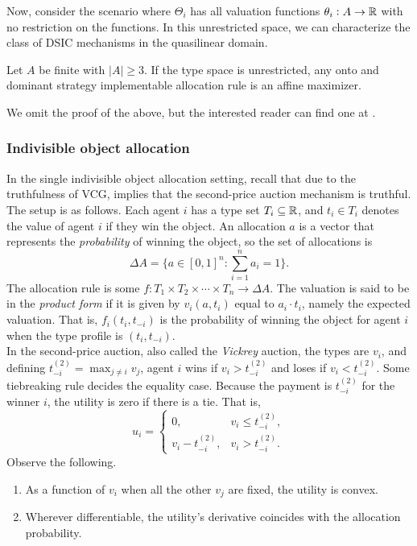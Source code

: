 		Now, consider the scenario where $\Theta_i$ has all valuation functions $\theta_i : A \to \mathbb{R}$ with no restriction on the functions. In this unrestricted space, we can characterize the class of DSIC mechanisms in the quasilinear domain.

		\begin{ftheo}[Roberts]
			Let $A$ be finite with $|A| \ge 3$. If the type space is unrestricted, any onto and dominant strategy implementable allocation rule is an affine maximizer.
		\end{ftheo}

		We omit the proof of the above, but the interested reader can find one at \cite{roberts}.

	\subsubsection{Indivisible object allocation}

		In the single indivisible object allocation setting, recall that due to the truthfulness of VCG,  implies that the second-price auction mechanism is truthful.\\

		The setup is as follows. Each agent $i$ has a type set $T_i \subseteq \mathbb{R}$, and $t_i \in T_i$ denotes the value of agent $i$ if they win the object. An allocation $a$ is a vector that represents the \emph{probability} of winning the object, so the set of allocations is
		\[ \Delta A = \{ a \in [0,1]^n : \sum_{i=1}^n a_i = 1 \}. \]
		The allocation rule is some $f : T_1 \times T_2 \times \cdots \times T_n \to \Delta A$. The valuation is said to be in the \emph{product form} if it is given by $v_i(a,t_i)$ equal to $a_i\cdot t_i$, namely the expected valuation. That is, $f_i(t_i,t_{-i})$ is the probability of winning the object for agent $i$ when the type profile is $(t_i,t_{-i})$.\\

		In the second-price auction, also called the \emph{Vickrey} auction, the types are $v_i$, and defining $t_{-i}^{(2)} = \max_{j \ne i} v_j$, agent $i$ wins if $v_i > t_{-i}^{(2)}$ and loses if $v_i < t_{-i}^{(2)}$. Some tiebreaking rule decides the equality case. Because the payment is $t_{-i}^{(2)}$ for the winner $i$, the utility is zero if there is a tie. That is,
		\[ u_i = \begin{cases} 0, & v_i \le t_{-i}^{(2)}, \\ v_i - t_{-i}^{(2)}, & v_i > t_{-i}^{(2)}. \end{cases} \]
		Observe the following.
		\begin{enumerate}
			\item As a function of $v_i$ when all the other $v_j$ are fixed, the utility is convex.
			\item Wherever differentiable, the utility's derivative coincides with the allocation probability.
		\end{enumerate}

